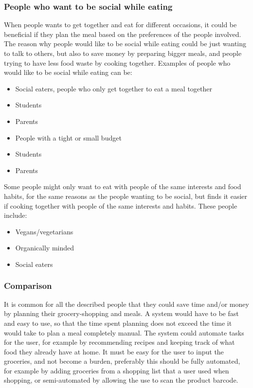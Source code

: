 \subsubsection{People who want to be social while eating}
When people wants to get together and eat for different occasions, it could be beneficial if they plan the meal based on the preferences of the people involved. The reason why people would like to be social while eating could be just wanting to talk to others, but also to save money by preparing bigger meals, and people trying to have less food waste by cooking together. Examples of people who would like to be social while eating can be:
\begin{itemize}
\item Social eaters, people who only get together to eat a meal together
\item Students
\item Parents
\item People with a tight or small budget
\item Students
\item Parents
\end{itemize}

Some people might only want to eat with people of the same interests and food habits, for the same reasons as the people wanting to be social, but finds it easier if cooking together with people of the same interests and habits. These people include:

\begin{itemize}
\item Vegans/vegetarians
\item Organically minded
\item Social eaters
\end{itemize}

\subsubsection{Comparison}
It is common for all the described people that they could save time and/or money by planning their grocery-shopping and meals. A system would have to be fast and easy to use, so that the time spent planning does not exceed the time it would take to plan a meal completely manual. The system could automate tasks for the user, for example by recommending recipes and keeping track of what food they already have at home. It must be easy for the user to input the groceries, and not become a burden, preferably this should be fully automated, for example by adding groceries from a shopping list that a user used when shopping, or semi-automated by allowing the use to scan the product barcode.